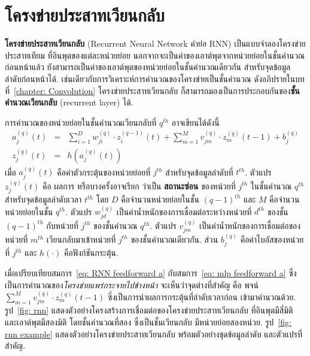 

\section{โครงข่ายประสาทเวียนกลับ}
\label{sec: RNN}

\textbf{โครงข่ายประสาทเวียนกลับ} (Recurrent Neural Network คำย่อ RNN)
เป็นแบบจำลองโครงข่ายประสาทเทียม ที่อินพุตของแต่ละหน่วยย่อย นอกจากจะเป็นค่าของเอาต์พุตจากหน่วยย่อยในชั้นคำนวณก่อนหน้าแล้ว
ยังสามารถเป็นค่าของเอาต์พุตของหน่วยย่อยในชั้นคำนวณเดียวกัน สำหรับจุดข้อมูลลำดับก่อนหน้าได้.
เช่นเดียวกับการวิเคราะห์การคำนวณของโครงข่ายเป็นชั้นคำนวณ ดังอภิปรายในบทที่~\ref{chapter: Convolution}
โครงข่ายประสาทเวียนกลับ ก็สามารถมองเป็นการประกอบกันของ\textbf{ชั้นคำนวณเวียนกลับ} (recurrent layer) ได้.

การคำนวณของหน่วยย่อยในชั้นคำนวณเวียนกลับที่ $q^{th}$ อาจเขียนได้ดังนี้
\begin{eqnarray}
a_j^{(q)}(t) 
&=& \sum_{i=1}^D w_{ji}^{(q)} \cdot z_{i}^{(q-1)}(t) + \sum_{m=1}^M v_{jm}^{(q)} \cdot z_m^{(q)}(t-1) + b_j^{(q)}
\label{eq: RNN feedforward a} \\
z_j^{(q)}(t) &=& h(a_j^{(q)}(t))
\label{eq: RNN feedforward z}
\end{eqnarray}
เมื่อ $a_j^{(q)}(t)$ คือค่าตัวกระตุ้นของหน่วยย่อยที่ $j^{th}$ สำหรับจุดข้อมูลลำดับที่ $t^{th}$.
ตัวแปร $z_j^{(q)}(t)$ คือ ผลการ
หรือบางครั้งอาจเรียก 
ว่าเป็น \textbf{สถานะซ่อน}
ของหน่วยที่ $j^{th}$ ในชั้นคำนวณ $q^{th}$ สำหรับจุดข้อมูลลำดับเวลา $t^{th}$
โดย $D$ คือจำนวนหน่วยย่อยในชั้น $(q-1)^{th}$
และ $M$ คือจำนวนหน่วยย่อยในชั้น $q^{th}$.
ตัวแปร $w_{jd}^{(q)}$ เป็นค่าน้ำหนักของการเชื่อมต่อระหว่างหน่วยที่ $d^{th}$ ของชั้น $(q-1)^{th}$ กับหน่วยที่ $j^{th}$ ของชั้นคำนวณ $q^{th}$.
ตัวแปร $v_{jm}^{(q)}$ เป็นค่าน้ำหนักของการเชื่อมต่อของหน่วยที่ $m^{th}$ เวียนกลับมาเข้าหน่วยที่ $j^{th}$ ของชั้นคำนวณเดียวกัน.
ส่วน $b_j^{(q)}$ คือค่าไบอัสของหน่วยที่ $j^{th}$
และ $h(\cdot)$ คือฟังก์ชันกระตุ้น.

เมื่อเปรียบเทียบสมการ~\ref{eq: RNN feedforward a}
กับสมการ~\ref{eq: mlp feedforward a} ซึ่งเป็นการคำนวณของ\textit{โครงข่ายแพร่กระจายไปข้างหน้า}
จะเห็นว่าจุดต่างที่สำคัญ คือ พจน์ $\sum_{m=1}^M v_{jm}^{(q)} \cdot z_m^{(q)}(t-1)$
ซึ่งเป็นการนำผลการกระตุ้นที่ลำดับเวลาก่อน เข้ามาคำนวณด้วย.
รูป~\ref{fig: rnn} แสดงตัวอย่างโครงสร้างการเชื่อมต่อของโครงข่ายประสาทเวียนกลับ ที่อินพุตมีสี่มิติ 
และเอาต์พุตมีสองมิติ
โดยชั้นคำนวณที่สอง ซึ่งเป็นชั้นเวียนกลับ มีหน่วยย่อยสองหน่วย.
รูป~\ref{fig: rnn example} แสดงตัวอย่างโครงข่ายประสาทเวียนกลับ พร้อมตัวอย่างชุดข้อมูลลำดับ และตัวแปรที่สำคัญ.


